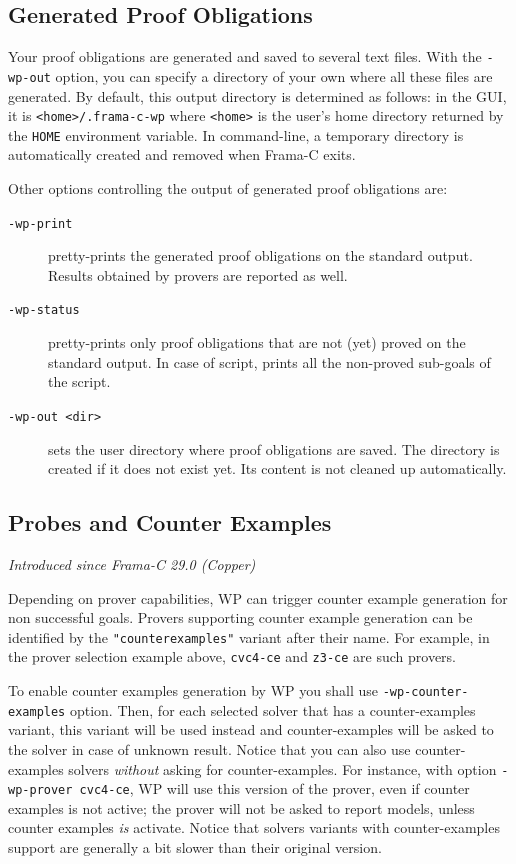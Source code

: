 \subsection{Generated Proof Obligations}
Your proof obligations are generated and saved to several text
files. With the \texttt{-wp-out} option, you can specify a directory
of your own where all these files are generated. By default, this
output directory is determined as follows: in the GUI, it is
\texttt{<home>/.frama-c-wp} where \texttt{<home>} is the user's home
directory returned by the \texttt{HOME} environment variable. In
command-line, a temporary directory is automatically created and
removed when \textsf{Frama-C} exits.

Other options controlling the output of generated proof
obligations are:
\begin{description}
\item[\tt -wp-print] pretty-prints the generated proof obligations on
  the standard output. Results obtained by provers are reported as
  well.
\item[\tt -wp-status] pretty-prints only proof obligations that are not (yet)
  proved on the standard output. In case of script, prints all the non-proved
  sub-goals of the script.
\item[\tt -wp-out <dir>] sets the user directory where proof
  obligations are saved. The directory is created if it does not exist
  yet. Its content is not cleaned up automatically.
\end{description}

\subsection{Probes and Counter Examples}

\emph{Introduced since Frama-C 29.0 (Copper)}

Depending on prover capabilities, \textsf{WP} can trigger counter example
generation for non successful goals. Provers supporting counter example
generation can be identified by the \verb$"counterexamples"$ variant after their
name. For example, in the prover selection example above, \verb+cvc4-ce+ and
\verb+z3-ce+ are such provers.

To enable counter examples generation by \textsf{WP} you shall use
\verb+-wp-counter-examples+ option. Then, for each selected solver that has a
counter-examples variant, this variant will be used instead and counter-examples
will be asked to the solver in case of unknown result. Notice that you can also
use counter-examples solvers \emph{without} asking for counter-examples. For
instance, with option \verb+-wp-prover cvc4-ce+, \textsf{WP} will use this
version of the prover, even if counter examples is not active; the prover will
not be asked to report models, unless counter examples \emph{is}
activate. Notice that solvers variants with counter-examples support are
generally a bit slower than their original version.

